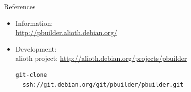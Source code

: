 \documentclass[dvipdfm,12pt,times]{beamer}
\begin{document}
\begin{frame}[containsverbatim]{References}
\begin{itemize}
 \item Information:\\
       \url{http://pbuilder.alioth.debian.org/}

 \item Development:\\
 alioth project: \url{http://alioth.debian.org/projects/pbuilder}

\begin{verbatim}
git-clone
  ssh://git.debian.org/git/pbuilder/pbuilder.git
\end{verbatim}
\end{itemize}
\end{frame}
\end{document}

